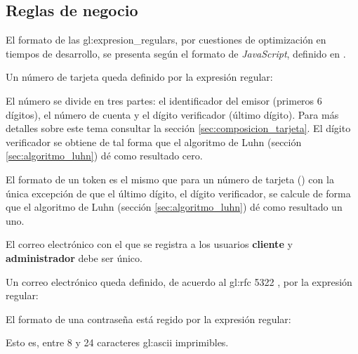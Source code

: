 %
%

\subsection{Reglas de negocio}

El formato de las \glspl{gl:expresion_regular}, por cuestiones de optimización
en tiempos de desarrollo, se presenta según el formato de \textit{JavaScript},
definido en \cite{mozilla_er}.

{
  Un número de tarjeta queda definido por la expresión regular:


  El número se divide en tres partes: el identificador del emisor (primeros 6
  dígitos), el número de cuenta y el dígito verificador (último dígito). Para
  más detalles sobre este tema consultar la sección
  \ref{sec:composicion_tarjeta}. El dígito verificador se obtiene de tal forma
  que el algoritmo de Luhn (sección \ref{sec:algoritmo_luhn}) dé como resultado
  cero.
}

{
  El formato de un token es el mismo que para un número de tarjeta
  () con la única excepción de que el
  último dígito, el dígito verificador, se calcule de forma que el algoritmo de
  Luhn (sección \ref{sec:algoritmo_luhn}) dé como resultado un uno.
}

{
  El correo electrónico con el que se registra a los usuarios \textbf{cliente}
  y \textbf{administrador} debe ser único.
}

{
  Un correo electrónico queda definido, de acuerdo al \gls{gl:rfc} 5322
  \cite{DBLP:journals/rfc/rfc5322}, por la expresión regular:

}

{
  El formato de una contraseña está regido por la expresión regular:


  Esto es, entre 8 y 24 caracteres \gls{gl:ascii} imprimibles.
}

